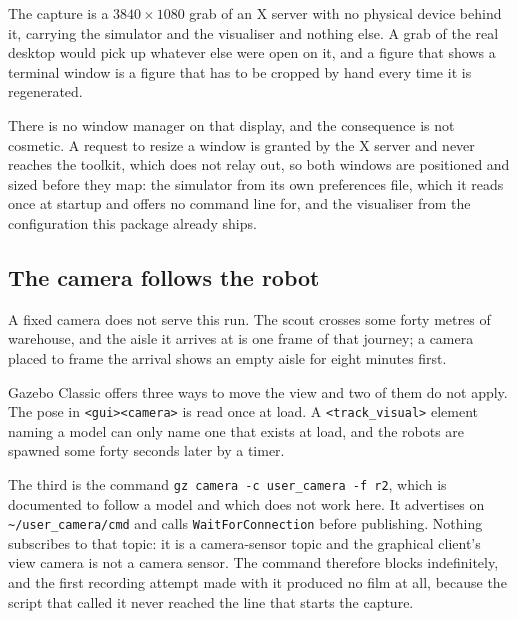 \documentclass[11pt,a4paper]{article}
\theoremstyle{definition}
\newcommand{\code}[1]{\texttt{\small #1}}
\begin{document}
The capture is a $3840 \times 1080$ grab of an X server with no physical
device behind it, carrying the simulator and the visualiser and nothing else.
A grab of the real desktop would pick up whatever else were open on it, and a
figure that shows a terminal window is a figure that has to be cropped by hand
every time it is regenerated.

There is no window manager on that display, and the consequence is not
cosmetic. A request to resize a window is granted by the X server and never
reaches the toolkit, which does not relay out, so both windows are positioned
and sized before they map: the simulator from its own preferences file, which
it reads once at startup and offers no command line for, and the visualiser
from the configuration this package already ships.

\subsection{The camera follows the robot}

A fixed camera does not serve this run. The scout crosses some forty metres of
warehouse, and the aisle it arrives at is one frame of that journey; a camera
placed to frame the arrival shows an empty aisle for eight minutes first.

Gazebo Classic offers three ways to move the view and two of them do not
apply. The pose in \code{<gui><camera>} is read once at load. A
\code{<track\_visual>} element naming a model can only name one that exists at
load, and the robots are spawned some forty seconds later by a timer.

The third is the command \code{gz camera -c user\_camera -f r2}, which is
documented to follow a model and which does not work here. It advertises on
\code{\textasciitilde/user\_camera/cmd} and calls
\code{WaitForConnection} before publishing. Nothing subscribes to that topic:
it is a camera-sensor topic and the graphical client's view camera is not a
camera sensor. The command therefore blocks indefinitely, and the first
recording attempt made with it produced no film at all, because the script that
called it never reached the line that starts the capture.
\end{document}
